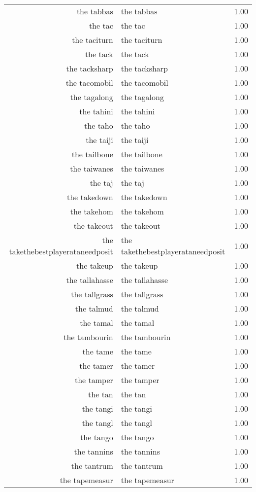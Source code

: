 \begin{table}[ht]
\begin{tabular}{rlr}
  the tabbas & the tabbas & 1.00 \\ 
  the tac & the tac & 1.00 \\ 
  the taciturn & the taciturn & 1.00 \\ 
  the tack & the tack & 1.00 \\ 
  the tacksharp & the tacksharp & 1.00 \\ 
  the tacomobil & the tacomobil & 1.00 \\ 
  the tagalong & the tagalong & 1.00 \\ 
  the tahini & the tahini & 1.00 \\ 
  the taho & the taho & 1.00 \\ 
  the taiji & the taiji & 1.00 \\ 
  the tailbone & the tailbone & 1.00 \\ 
  the taiwanes & the taiwanes & 1.00 \\ 
  the taj & the taj & 1.00 \\ 
  the takedown & the takedown & 1.00 \\ 
  the takehom & the takehom & 1.00 \\ 
  the takeout & the takeout & 1.00 \\ 
  the takethebestplayerataneedposit & the takethebestplayerataneedposit & 1.00 \\ 
  the takeup & the takeup & 1.00 \\ 
  the tallahasse & the tallahasse & 1.00 \\ 
  the tallgrass & the tallgrass & 1.00 \\ 
  the talmud & the talmud & 1.00 \\ 
  the tamal & the tamal & 1.00 \\ 
  the tambourin & the tambourin & 1.00 \\ 
  the tame & the tame & 1.00 \\ 
  the tamer & the tamer & 1.00 \\ 
  the tamper & the tamper & 1.00 \\ 
  the tan & the tan & 1.00 \\ 
  the tangi & the tangi & 1.00 \\ 
  the tangl & the tangl & 1.00 \\ 
  the tango & the tango & 1.00 \\ 
  the tannins & the tannins & 1.00 \\ 
  the tantrum & the tantrum & 1.00 \\ 
  the tapemeasur & the tapemeasur & 1.00 \\ 

\end{tabular}
\end{table}
